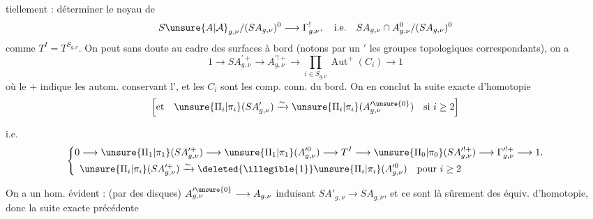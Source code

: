 tiellement : déterminer le noyau de
\[
S\unsure{A|\mathcal A}_{g,\nu}/(SA_{g,\nu})^0\longrightarrow\Gamma^!_{g,\nu},
\quad\text{i.e.}\quad
SA_{g,\nu}\cap A_{g,\nu}^0/(SA_{g,\nu})^0
\]
comme $T^I=T^{S_{g,\nu}}$. On peut sans doute  au cadre des surfaces  à bord (notons par un $'$ les groupes topologiques correspondants), on a
\[
1\longrightarrow SA_{g,\nu}^{\prime+}\longrightarrow
A_{g,\nu}^{\prime!+}\longrightarrow
\prod_{i\in S_{g,\nu}}\operatorname{Aut}^+(C_i)\longrightarrow1
\]
où le $+$ indique les autom. conservant l', et les $C_i$ sont les comp. conn. du bord. On en conclut la suite exacte d'homotopie
\[
\left[\text{et}\quad
\unsure{\Pi_i|\pi_i}(SA'_{g,\nu})\xrightarrow{\sim}
\unsure{\Pi_i|\pi_i}(A_{g,\nu}^{\prime\unsure{0}})
\quad\text{si }i\geq2\right]
\]

i.e.
\[
\left\{\begin{aligned}
0&\longrightarrow\unsure{\Pi_1|\pi_1}(SA_{g,\nu}^{\prime+})
\longrightarrow\unsure{\Pi_1|\pi_1}(A_{g,\nu}^{\prime0})
\longrightarrow T^I\longrightarrow\unsure{\Pi_0|\pi_0}(SA_{g,\nu}^{\prime!+})
\longrightarrow\Gamma_{g,\nu}^{\prime!+}\longrightarrow1.\\
&\unsure{\Pi_i|\pi_i}(SA_{g,\nu}^{\prime+})\xrightarrow{\sim}
\deleted{\illegible{1}}\unsure{\Pi_i|\pi_i}(A_{g,\nu}^{\prime0})
\quad\text{pour }i\geq2
\end{aligned}\right.
\]

On a un hom. évident : (par  des disques)
$A_{g,\nu}^{\prime\unsure{0}}\longrightarrow A_{g,\nu}$ induisant
$SA'_{g,\nu}\longrightarrow SA_{g,\nu}$,
 et ce sont là sûrement des équiv. d'homotopie, donc
 la suite exacte précédente

